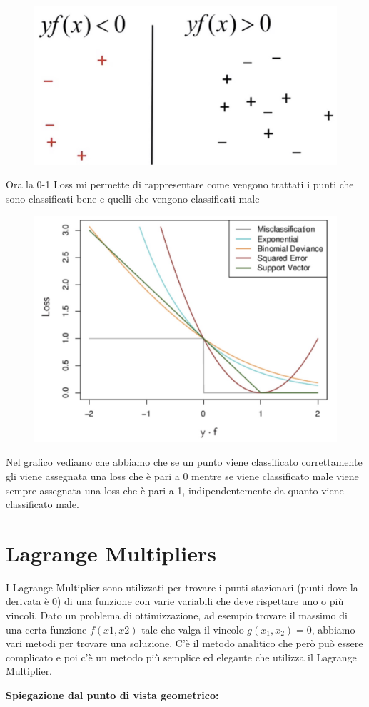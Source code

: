 \documentclass[14pt]{extreport}
\begin{document}
\begin{figure}[H]
\centering
\includegraphics[width=0.5\linewidth]{329.jpeg}
\end{figure}

Ora la 0-1 Loss mi permette di rappresentare come vengono trattati i punti che sono classificati bene e quelli che vengono classificati male

\begin{figure}[H]
\centering
\includegraphics[width=0.5\linewidth]{331.jpeg}
\end{figure}

Nel grafico vediamo che abbiamo che se un punto viene classificato correttamente gli viene assegnata una loss che è pari a 0 mentre se viene
classificato male viene sempre assegnata una loss che è pari a 1, indipendentemente da quanto viene classificato male.


\section{Lagrange Multipliers}

I Lagrange Multiplier sono utilizzati per trovare i punti stazionari (punti dove la derivata è 0) di una funzione con varie variabili che deve
rispettare uno o più vincoli. Dato un problema di ottimizzazione, ad esempio trovare il massimo di una certa funzione $f(x1,x2)$ tale che valga il
vincolo $g(x_1, x_2) = 0$, abbiamo vari metodi per trovare una soluzione. C'è il metodo analitico che però può essere complicato e poi c'è un metodo
più semplice ed elegante che utilizza il Lagrange Multiplier.

\textbf{Spiegazione dal punto di vista geometrico:}
\end{document}
